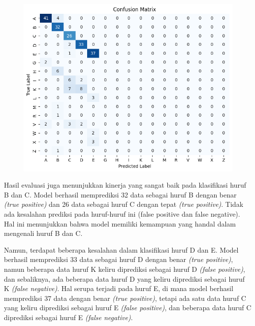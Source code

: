 \begin{figure}[!hbt]
	\centering
	\includegraphics[width=0.7\linewidth]{gambar/bener/ConfusionMatrix-Ujicoba-Xception.png}
	\label{fig:HasilUjicobaCNNXception}
\end{figure}

Hasil evaluasi juga menunjukkan kinerja yang sangat baik pada klasifikasi huruf B dan C. Model berhasil memprediksi 32 data sebagai huruf B dengan benar \textit{(true positive)} dan 26 data sebagai huruf C dengan tepat \textit{(true positive)}. Tidak ada kesalahan prediksi pada huruf-huruf ini (false positive dan false negative). Hal ini menunjukkan bahwa model memiliki kemampuan yang handal dalam mengenali huruf B dan C.

Namun, terdapat beberapa kesalahan dalam klasifikasi huruf D dan E. Model berhasil memprediksi 33 data sebagai huruf D dengan benar \textit{(true positive)}, namun beberapa data huruf K keliru diprediksi sebagai huruf D \textit{(false positive)}, dan sebaliknya, ada beberapa data huruf D yang keliru diprediksi sebagai huruf K \textit{(false negative)}. Hal serupa terjadi pada huruf E, di mana model berhasil memprediksi 37 data dengan benar \textit{(true positive)}, tetapi ada satu data huruf C yang keliru diprediksi sebagai huruf E \textit{(false positive)}, dan beberapa data huruf C diprediksi sebagai huruf E \textit{(false negative)}.